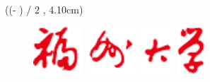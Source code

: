 \pagestyle{empty}{\fancyhf{}}
\begin{titlepage}


    \begin{textblock*}{\textwidth}(\dimexpr (\paperwidth - \textwidth) / 2 \relax, 4.10cm) %
        \begin{figure}[H]
            \centering
            \includegraphics[height=1.85cm, keepaspectratio]{TemplateAssets/fzu1.pdf}
            \hspace{0.56cm}
            \includegraphics[height=1.85cm, keepaspectratio]{TemplateAssets/fzu2.pdf}
            \hspace{0.56cm}
            \includegraphics[height=1.85cm, keepaspectratio]{TemplateAssets/fzu3.pdf}
            \hspace{0.56cm}
            \includegraphics[height=1.85cm, keepaspectratio]{TemplateAssets/fzu4.pdf}
        \end{figure}
    \end{textblock*}


\end{titlepage}
